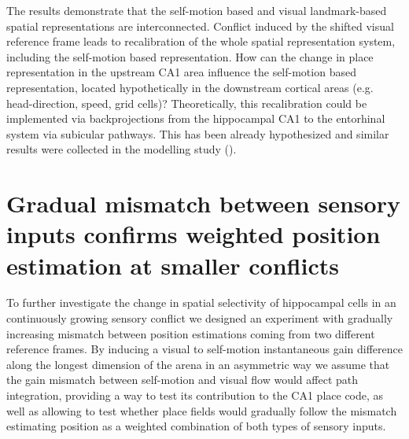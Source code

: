The results demonstrate that the self-motion based and visual landmark-based spatial representations are interconnected. Conflict induced by the shifted visual reference frame leads to recalibration of the whole spatial representation system, including the self-motion based representation. How can the change in place representation in the upstream CA1 area influence the self-motion based representation, located hypothetically in the downstream cortical areas (e.g. head-direction, speed, grid cells)? Theoretically, this recalibration could be implemented via backprojections from the hippocampal CA1 to the entorhinal system via subicular pathways. This has been already hypothesized and similar results were collected in the modelling study (\cite{Li2020}).


\section[Weighted position estimation at smaller sensory conflicts]{Gradual mismatch between sensory inputs confirms weighted position estimation at smaller conflicts%
              }
\label{sec:gain_12}

To further investigate the change in spatial selectivity of hippocampal cells in an continuously growing sensory conflict we designed an experiment with gradually increasing mismatch between position estimations coming from two different reference frames. By inducing a visual to self-motion instantaneous gain difference along the longest dimension of the arena in an asymmetric way we assume that the gain mismatch between self-motion and visual flow would affect path integration, providing a way to test its contribution to the CA1 place code, as well as allowing to test whether place fields would gradually follow the mismatch estimating position as a weighted combination of both types of sensory inputs.

